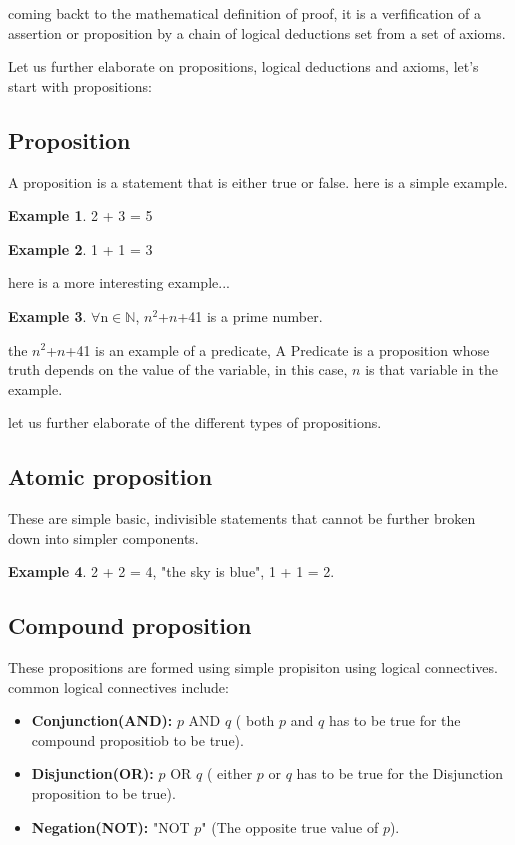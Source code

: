 \documentclass{article}
\theoremstyle{definition}
\newtheorem{example}{Example}
\newcommand{\N}{\mathbb{N}}
\begin{document}
coming backt to the mathematical definition of proof, it is a verfification of a assertion or proposition by a chain of logical deductions set from a set of axioms. 


Let us further elaborate on propositions, logical deductions and axioms, let's start with propositions:

\subsection{Proposition}

A proposition is a statement that is either true or false.
here is a simple example.

\begin{example}
  2 + 3 = 5
\end{example}
\begin{example}
  1 + 1 = 3
\end{example}
  
here is a more interesting example...

\begin{example}
$\forall$n$\in$$\N$, $n^2$+$n$+41 is a prime number.
\end{example}
the $n^2$+$n$+41 is an example of a predicate, A Predicate is a proposition whose truth depends on the value of the variable, in this case, $n$ is that variable in the example.

let us further elaborate of the different types of propositions.

\subsection{Atomic proposition}
These are simple basic, indivisible statements that cannot be further broken down into simpler components.

\begin{example}
 2 + 2 = 4, "the sky is blue", 1 + 1 = 2.
\end{example}

\subsection{Compound proposition}
These propositions are formed using simple propisiton using logical connectives.
common logical connectives include:

\begin{itemize}
  \item \textbf{Conjunction(AND):} $p$ AND $q$ ( both $p$ and $q$ has to be true for the compound propositiob to be true).
  \item \textbf{Disjunction(OR):} $p$ OR $q$ ( either $p$ or $q$ has to be true for the Disjunction proposition to be true).
  \item \textbf{Negation(NOT):} "NOT $p$" (The opposite true value of $p$).
\end{itemize}
\end{document}
